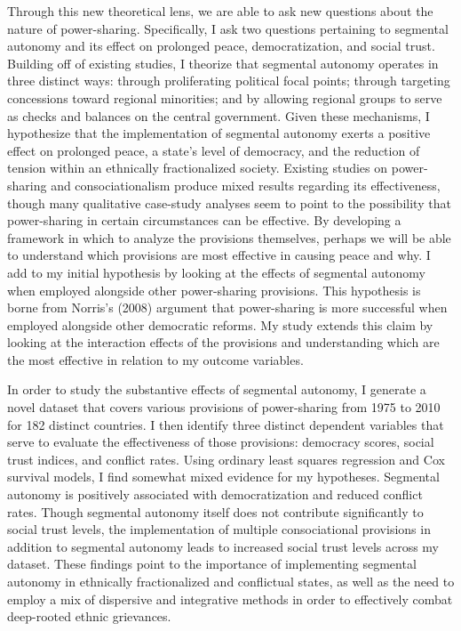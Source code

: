 \documentclass[12pt]{article}
\begin{document}
Through this new theoretical lens, we are able to ask new questions about the nature of power-sharing. Specifically, I ask two questions pertaining to segmental autonomy and its effect on prolonged peace, democratization, and social trust. Building off of existing studies, I theorize that segmental autonomy operates in three distinct ways: through proliferating political focal points; through targeting concessions toward regional minorities; and by allowing regional groups to serve as checks and balances on the central government. Given these mechanisms, I hypothesize that the implementation of segmental autonomy exerts a positive effect on prolonged peace, a state’s level of democracy, and the reduction of tension within an ethnically fractionalized society. Existing studies on power-sharing and consociationalism produce mixed results regarding its effectiveness, though many qualitative case-study analyses seem to point to the possibility that power-sharing in certain circumstances can be effective. By developing a framework in which to analyze the provisions themselves, perhaps we will be able to understand which provisions are most effective in causing peace and why. I add to my initial hypothesis by looking at the effects of segmental autonomy when employed alongside other power-sharing provisions. This hypothesis is borne from Norris’s (2008) argument that power-sharing is more successful when employed alongside other democratic reforms. My study extends this claim by looking at the interaction effects of the provisions and understanding which are the most effective in relation to my outcome variables.

In order to study the substantive effects of segmental autonomy, I generate a novel dataset that covers various provisions of power-sharing from 1975 to 2010 for 182 distinct countries. I then identify three distinct dependent variables that serve to evaluate the effectiveness of those provisions: democracy scores, social trust indices, and conflict rates. Using ordinary least squares regression and Cox survival models, I find somewhat mixed evidence for my hypotheses. Segmental autonomy is positively associated with democratization and reduced conflict rates. Though segmental autonomy itself does not contribute significantly to social trust levels, the implementation of multiple consociational provisions in addition to segmental autonomy leads to increased social trust levels across my dataset. These findings point to the importance of implementing segmental autonomy in ethnically fractionalized and conflictual states, as well as the need to employ a mix of dispersive and integrative methods in order to effectively combat deep-rooted ethnic grievances. 
 
\end{document}
